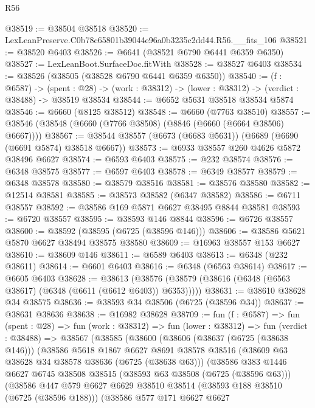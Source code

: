 \begin{lexlean}{R56}
\begin{coremodule}
@38519 := @38504 @38518
@38520 := LexLeanPreserve.C0b78c65801b39044e96a0b3235c2dd44.R56.__fits_106
@38521 := @38520 @6403
@38526 := @6641 (@38521 @6790 @6441 @6359 @6350)
@38527 := LexLeanBoot.SurfaceDoc.fitWith
@38528 := @38527 @6403
@38534 := @38526 (@38505 (@38528 @6790 @6441 @6359 @6350))
@38540 := (f : @6587) ->
  (spent : @28) -> (work : @38312) -> (lower : @38312) -> (verdict : @38488) -> @38519 @38534
@38544 := @6652 @5631 @38518 @38534 @5874
@38546 := @6660 (@8125 @38512)
@38548 := @6660 (@7763 @38510)
@38557 := @38546 (@38548 (@6660 (@7766 @38508) (@8846 (@6660 (@6664 @38506) @6667))))
@38567 := @38544 @38557 (@6673 (@6683 @5631)) (@6689 (@6690 (@6691 @5874) @38518 @6667))
@38573 := @6933 @38557 @260 @4626 @5872 @38496 @6627
@38574 := @6593 @6403
@38575 := @232 @38574
@38576 := @6348 @38575
@38577 := @6597 @6403
@38578 := @6349 @38577
@38579 := @6348 @38578
@38580 := @38579 @38516
@38581 := @38576 @38580
@38582 := @12514 @38581
@38585 := @38573 @38582 (@6347 @38582)
@38586 := @6711 @38557
@38592 := @38586 @169 @5871 @6627 @38495 @8844 @38581
@38593 := @6720 @38557
@38595 := @38593 @146 @8844
@38596 := @6726 @38557
@38600 := @38592 (@38595 (@6725 (@38596 @146)))
@38606 := @38586 @5621 @5870 @6627 @38494 @38575 @38580
@38609 := @16963 @38557 @153 @6627
@38610 := @38609 @146
@38611 := @6589 @6403
@38613 := @6348 (@232 @38611)
@38614 := @6601 @6403
@38616 := @6348 (@6563 @38614)
@38617 := @6605 @6403
@38628 := @38613
    (@38576 (@38579 (@38616 (@6348 (@6563 @38617) (@6348 (@6611 (@6612 @6403)) @6353)))))
@38631 := @38610 @38628 @34 @38575
@38636 := @38593 @34 @38506 (@6725 (@38596 @34))
@38637 := @38631 @38636
@38638 := @16982 @38628
@38709 := fun (f : @6587) =>
  fun (spent : @28) =>
  fun (work : @38312) =>
  fun (lower : @38312) =>
  fun (verdict : @38488) =>
  @38567
    (@38585
      (@38600
        (@38606
          (@38637 (@6725 (@38638 @146)))
          (@38586
            @5618
            @1867
            @6627
            @8691
            @38578
            @38516
            (@38609 @63 @38628 @34 @38578 @38636 (@6725 (@38638 @63)))
            (@38586
              @383
              @1446
              @6627
              @6745
              @38508
              @38515
              (@38593 @63 @38508 (@6725 (@38596 @63)))
              (@38586
                @447
                @579
                @6627
                @6629
                @38510
                @38514
                (@38593 @188 @38510 (@6725 (@38596 @188)))
                (@38586
                  @577
                  @171
                  @6627
                  @6627

\end{coremodule}
\end{lexlean}
